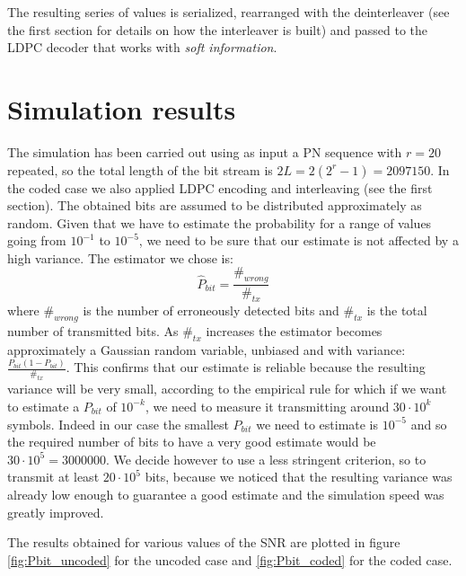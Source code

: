 \documentclass[a4paper,11.5pt]{article}
\begin{document}
 The resulting series of values is serialized, rearranged with the deinterleaver (see the first section for details on how the interleaver is built) and passed to the LDPC decoder that works with \emph{soft information}.

\section*{Simulation results}

The simulation has been carried out using as input a PN sequence with $r=20$ repeated, so the total length of the bit stream is $2L = 2(2^r-1) = 2097150$. In the coded case we also applied LDPC encoding and interleaving (see the first section). The obtained bits are assumed to be distributed approximately as random. Given that we have to estimate the probability for a range of values going from $10^{-1}$ to $10^{-5}$, we need to be sure that our estimate is not affected by a high variance. The estimator we chose is:
\begin{equation}
\hat{P}_{bit} = \frac{\#_{wrong}}{\#_{tx}}
\end{equation}
where $\#_{wrong}$ is the number of erroneously detected bits and $\#_{tx}$ is the total number of transmitted bits. As $\#_{tx}$ increases the estimator becomes approximately a Gaussian random variable, unbiased and with variance: $\frac{P_{bit} (1-P_{bit})}{\#_{tx}}$. This confirms that our estimate is reliable because the resulting variance will be very small, according to the empirical rule for which if we want to estimate a $P_{bit}$ of $10^{-k}$, we need to measure it transmitting around $30\cdot 10^{k}$ symbols. Indeed in our case the smallest $P_{bit}$ we need to estimate is $10^{-5}$ and so the required number of bits to have a very good estimate would be $30\cdot 10^{5}= 3000000$. We decide however to use a less stringent criterion, so to transmit at least $20\cdot 10^5$ bits, because we noticed that the resulting variance was already low enough to guarantee a good estimate and the simulation speed was greatly improved.

The results obtained for various values of the SNR are plotted in figure \ref{fig:Pbit_uncoded} for the uncoded case and \ref{fig:Pbit_coded} for the coded case.
\end{document}

